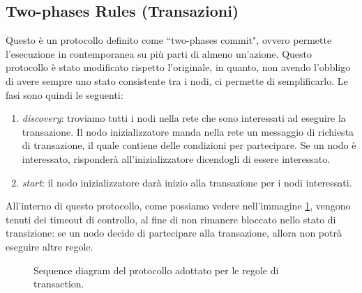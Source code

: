 \documentclass[italian]{memoir}
\begin{document}
\subsection{Two-phases Rules (Transazioni)}
Questo è un protocollo definito come ``two-phases commit", ovvero permette l'esecuzione in
contemporanea su più parti di almeno un'azione. Questo protocollo è stato modificato rispetto
l'originale, in quanto, non avendo l'obbligo di avere sempre uno stato consistente tra i nodi,
ci permette di semplificarlo. Le fasi sono quindi le seguenti:
\begin{enumerate}
    \item \textit{discovery}: troviamo tutti i nodi nella rete che sono interessati ad eseguire la
    transazione. Il nodo inizializzatore manda nella rete un messaggio di richiesta di transazione,
    il quale contiene delle condizioni per partecipare. Se un nodo è interessato, risponderà all'inizializzatore
    dicendogli di essere interessato.
    \item \textit{start}: il nodo inizializzatore darà inizio alla transazione per i nodi interessati.
\end{enumerate}
All'interno di questo protocollo, come possiamo vedere nell'immagine \ref{img:transazioni}, vengono tenuti dei timeout
di controllo, al fine di non rimanere bloccato nello stato di transizione: se un nodo decide di partecipare 
alla transazione, allora non potrà eseguire altre regole.

\begin{figure}[H]
\caption{Sequence diagram del protocollo adottato per le regole di transaction.}
\label{img:transazioni}
\end{figure}
\end{document}
